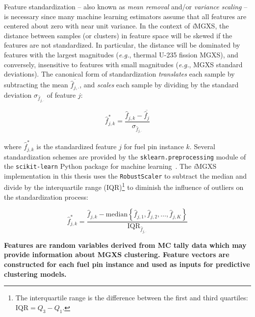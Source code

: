 Feature standardization -- also known as \textit{mean removal} and/or \textit{variance scaling} -- is necessary since many machine learning estimators assume that all features are centered about zero with near unit variance. In the context of \textit{i}\ac{MGXS}, the distance between samples (or clusters) in feature space will be skewed if the features are not standardized. In particular, the distance will be dominated by features with the largest magnitudes (\textit{e.g.}, thermal U-235 fission \ac{MGXS}), and conversely, insensitive to features with small magnitudes (\textit{e.g.}, \ac{MGXS} standard deviations). The canonical form of standardization \textit{translates} each sample by subtracting the mean $\overline{\hat{f}_{j,\cdot}}$, and \textit{scales} each sample by dividing by the standard deviation $\sigma_{\hat{f}_{j,\cdot}}$ of feature $j$:

\begin{equation}
\label{eqn:chap10-standard-standardize}
\hat{f}_{j,k}^{*} = \frac{\hat{f}_{j,k} - \overline{\hat{f}_{j}}}{\sigma_{\hat{f}_{j,\cdot}}}
\end{equation}

\noindent where $\hat{f}_{j,k}^{*}$ is the standardized feature $j$ for fuel pin instance $k$. Several standardization schemes are provided by the \texttt{sklearn.preprocessing} module of the \texttt{scikit-learn} Python package for machine learning~\cite{pedregosa2011sklearn}. The \textit{i}\ac{MGXS} implementation in this thesis uses the \texttt{RobustScaler} to subtract the median and divide by the interquartile range (IQR)\footnote{The interquartile range is the difference between the first and third quartiles: $\mathrm{IQR} = Q_{3} - Q_{1}$.} to diminish the influence of outliers on the standardization process:

\begin{equation}
\label{eqn:chap10-robust-standardize}
\hat{f}_{j,k}^{*} = \frac{\hat{f}_{j,k} - \mathrm{median}\left\{\hat{f}_{j,1}, \hat{f}_{j,2}, \dots, \hat{f}_{j,K}\right\}}{\mathrm{IQR}_{\hat{f}_{j,\cdot}}}
\end{equation}

\begin{emphbox}
\textbf{Features are random variables derived from \ac{MC} tally data which may provide information about \ac{MGXS} clustering. Feature vectors are constructed for each fuel pin instance and used as inputs for predictive clustering models.}
\end{emphbox}


